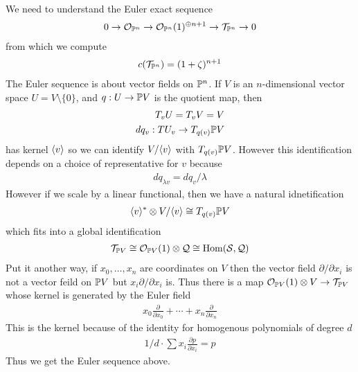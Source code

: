 \documentclass[12pt]{article}
\begin{document}
\begin{example}
    We need to understand the Euler exact sequence \begin{align*}
        0 \to \cO_{\P^n} \to \cO_{\P^n}(1)^{\oplus n+1} \to \cT_{\P^n} \to 0
    \end{align*} from which we compute \begin{align*}
        c(\cT_{\P^n}) = (1 + \zeta)^{n+1}
    \end{align*}  
    The Euler sequence is about vector fields on $\P^n$. 
    If $V$ is an $n$-dimensional vector space $U = V\setminus \{0\}$, and $q:U\to \P V$ is the quotient map, then
    \begin{align*}
        T_vU = T_vV = V \\
        dq_v:TU_v\to T_{q(v)}\P V
    \end{align*} has kernel $\ideal{v}$ so we can identify $V/\ideal{v}$ with $T_{q(v)}\P V$.
    However this identification depends on a choice of representative for $v$ because \begin{align*}
        dq_{\lambda v} = dq_v/\lambda
    \end{align*} However if we scale by a linear functional, then we have a natural idnetification \begin{align*}
        \ideal{v}^* \otimes V/\ideal{v} \cong T_{q(v)}\P V
    \end{align*} which fits into a global identification \begin{align*}
        \cT_{\P V} \cong \cO_{\P V}(1) \otimes \cQ \cong \Hom(\cS,\cQ)
    \end{align*} 
    Put it another way, if $x_0,\dots,x_n$ are coordinates on $V$ 
    then the vector field $\partial /\partial x_i$ is not a vector feild on $\P V$ but $x_i \partial/\partial x_i$ is.
    Thus there is a map $\cO_{\P V}(1)\otimes V \to \cT_{\P V}$ whose kernel is generated by the Euler field \begin{align*}
        x_0\frac{\partial}{\partial x_0} + \cdots + x_n\frac{\partial}{\partial x_n}
    \end{align*} This is the kernel because of the identity for homogenous polynomials of degree $d$ \begin{align*}
        1/d\cdot \sum x_i \frac{\partial p}{\partial x_i} = p
    \end{align*} Thus we get the Euler sequence above.
\end{example}

\begin{example}
\end{example}
\end{document}
